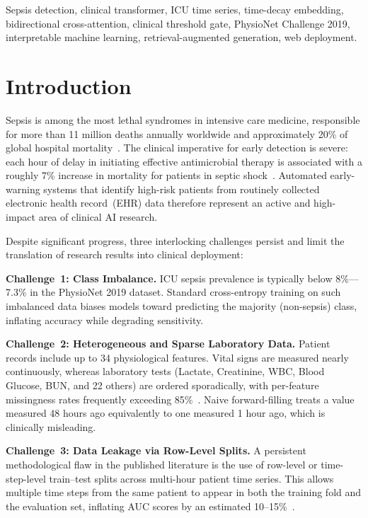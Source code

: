 \documentclass[conference,12pt]{IEEEtran}
\begin{document}
\begin{IEEEkeywords}
Sepsis detection, clinical transformer, ICU time series, time-decay embedding,
bidirectional cross-attention, clinical threshold gate, PhysioNet Challenge 2019,
interpretable machine learning, retrieval-augmented generation, web deployment.
\end{IEEEkeywords}

\section{\textbf{Introduction}}
\label{sec:intro}

Sepsis is among the most lethal syndromes in intensive care medicine,
responsible for more than 11 million deaths annually worldwide and approximately
20\% of global hospital mortality~\cite{singer2016}.
The clinical imperative for early detection is severe: each hour of delay in
initiating effective antimicrobial therapy is associated with a roughly 7\%
increase in mortality for patients in septic shock~\cite{kumar2006}.
Automated early-warning systems that identify high-risk patients from routinely
collected electronic health record~(EHR) data therefore represent an active and
high-impact area of clinical AI research.

Despite significant progress, three interlocking challenges persist and limit
the translation of research results into clinical deployment:

\textbf{Challenge~1: Class Imbalance.}
ICU sepsis prevalence is typically below 8\%---7.3\% in the PhysioNet 2019
dataset.
Standard cross-entropy training on such imbalanced data biases models toward
predicting the majority (non-sepsis) class, inflating accuracy while degrading
sensitivity.

\textbf{Challenge~2: Heterogeneous and Sparse Laboratory Data.}
Patient records include up to 34 physiological features.
Vital signs are measured nearly continuously, whereas laboratory tests
(Lactate, Creatinine, WBC, Blood Glucose, BUN, and 22 others) are ordered
sporadically, with per-feature missingness rates frequently exceeding
85\%~\cite{reyna2019}.
Naive forward-filling treats a value measured 48 hours ago equivalently to one
measured 1 hour ago, which is clinically misleading.

\textbf{Challenge~3: Data Leakage via Row-Level Splits.}
A persistent methodological flaw in the published literature is the use of
row-level or time-step-level train--test splits across multi-hour patient time
series.
This allows multiple time steps from the same patient to appear in both the
training fold and the evaluation set, inflating AUC scores by an estimated
10--15\%~\cite{johnson2023}.
\end{document}
